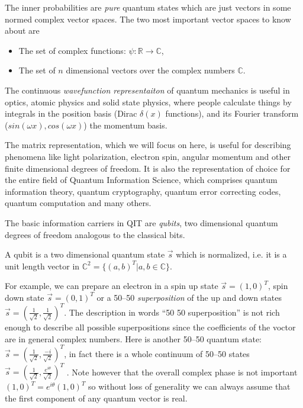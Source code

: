 \documentclass[aps,11pt,twoside,letterpaper]{article}
\def\c{\mathbb{C}}
\begin{document}
	        The inner probabilities are \emph{pure} quantum states 
	        which are just vectors in some normed complex vector spaces.
	        The two most important vector spaces to know about are  
	        \begin{itemize}
	            \item   The set of complex functions: $\psi \colon \mathbb{R} \to \mathbb{C} $,
	            \item   The set of $n$ dimensional vectors over the complex numbers $\c$.
	        \end{itemize}
	        The continuous \emph{wavefunction representaiton} of quantum mechanics is useful in optics,
	        atomic physics and solid state physics, where people calculate things by integrals in 
	        the position basis (Dirac $\delta(x)$ functions),
	        and its Fourier transform ($sin(\omega x),cos(\omega x)$) the momentum basis.

	        The matrix representation, which we will focus on here,  is useful for describing 
	        phenomena like light polarization, electron spin, angular momentum and other 
	        finite dimensional degrees of freedom.
	        It is also the representation of choice for the entire field of Quantum Information Science,
	        which comprises quantum information theory, quantum cryptography, quantum error correcting codes, 
	        quantum computation and many others.

	        The basic information carriers in QIT are \emph{qubits}, two dimensional quantum degrees
	        of freedom analogous to the classical bits. 

	        \begin{definition}[qubit]
	            A qubit is a two dimensional quantum state $\vec{s}$ which is normalized, i.e.
	            it is a unit length vector in $\c^2 = \{(a,b)^T| a,b \in \c\}$.
	        \end{definition}

	        For example, we can prepare an electron in a spin up state $\vec{s}=(1,0)^T$,
	        spin down state $\vec{s}=(0,1)^T$ or a 50--50 \emph{superposition} of the up and down states
	        $\vec{s} = (\frac{1}{\sqrt{2}}, \frac{1}{\sqrt{2}})^T$.
	        The description in words ``50 50 superposition'' is not rich enough to describe all possible superpositions since
	        the coefficients of the voctor are in general complex numbers. 
	        Here is another 50--50 quantum state: $\vec{s} = (\frac{1}{\sqrt{2}}, \frac{-i}{\sqrt{2}})^T$, in fact there is a
	        whole continuum of 50--50  states $\vec{s} = (\frac{1}{\sqrt{2}}, \frac{e^{i\theta}}{\sqrt{2}})^T$ .
	        Note however that the overall complex phase is not important $(1,0)^T= e^{i\theta}(1,0)^T$ so without loss
	        of generality we can always assume that the first component of any quantum vector is real.
\end{document}
